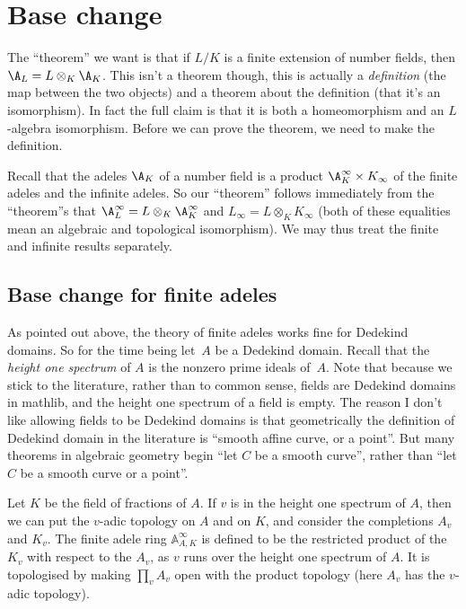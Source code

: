 \section{Base change}

The ``theorem'' we want is that if $L/K$ is a finite extension of number fields,
then $\A_L=L\otimes_K\A_K$. This isn't a theorem though, this is actually a \emph{definition}
(the map between the two objects) and a theorem about
the definition (that it's an isomorphism). In fact the full claim is that it is both a homeomorphism
and an $L$-algebra isomorphism. Before we can prove the theorem, we need to make the
definition.

Recall that the adeles $\A_K$ of a number field is a product $\A_K^\infty\times K_\infty$
of the finite adeles and the infinite adeles. So our ``theorem'' follows immediately from
the ``theorem''s that $\A_L^\infty=L\otimes_K\A_K^\infty$ and $L_\infty=L\otimes_KK_\infty$
(both of these equalities mean an algebraic and topological isomorphism).
We may thus treat the finite and infinite results separately.

\subsection{Base change for finite adeles}

As pointed out above, the theory of finite adeles works fine for Dedekind domains.
So for the time being let~$A$ be a Dedekind domain. Recall that the \emph{height one spectrum}
of $A$ is the nonzero prime ideals of~$A$. Note that because we stick to the literature,
rather than to common sense, fields are Dedekind domains in mathlib, and the
height one spectrum of a field is empty. The reason I don't like allowing fields
to be Dedekind domains is that geometrically the definition of Dedekind
domain in the literature is ``smooth affine curve, or a point''. But many theorems in algebraic
geometry begin ``let $C$ be a smooth curve'', rather than ``let $C$ be a smooth curve or a point''.

Let $K$ be the field of fractions of $A$. If $v$ is in the height one spectrum of $A$,
then we can put the $v$-adic topology on $A$ and on $K$, and consider the completions
$A_v$ and $K_v$. The finite adele ring $\mathbb{A}_{A,K}^\infty$ is defined to be
the restricted product of the $K_v$ with respect to the $A_v$, as $v$ runs over
the height one spectrum of $A$. It is topologised by making $\prod_v A_v$ open with
the product topology (here $A_v$ has the $v$-adic topology).


